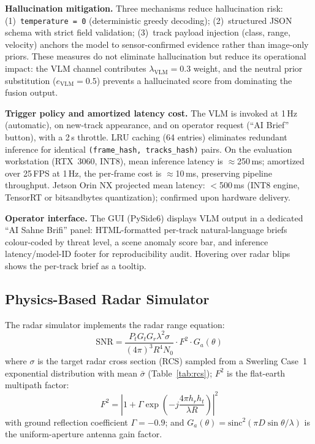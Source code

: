 \documentclass[drones,article,submit,pdftex]{Definitions/mdpi}
\begin{document}
\textbf{Hallucination mitigation.}
Three mechanisms reduce hallucination risk:
(1)~\texttt{temperature = 0} (deterministic greedy decoding);
(2)~structured JSON schema with strict field validation;
(3)~track payload injection (class, range, velocity) anchors the model
to sensor-confirmed evidence rather than image-only priors.
These measures do not eliminate hallucination but reduce its operational
impact: the VLM channel contributes $\lambda_\text{VLM} = 0.3$ weight,
and the neutral prior substitution ($e_\text{VLM} = 0.5$) prevents a
hallucinated score from dominating the fusion output.

\textbf{Trigger policy and amortized latency cost.}
The VLM is invoked at 1\,Hz (automatic), on new-track appearance, and on
operator request (``AI Brief'' button), with a 2\,s throttle.
LRU caching (64 entries) eliminates redundant inference for identical
\texttt{(frame\_hash, tracks\_hash)} pairs.
On the evaluation workstation (RTX~3060, INT8), mean inference latency is
$\approx$250\,ms; amortized over 25\,FPS at 1\,Hz, the per-frame cost is
$\approx$10\,ms, preserving pipeline throughput.
Jetson Orin NX projected mean latency: $<$500\,ms (INT8 engine,
TensorRT or bitsandbytes quantization); confirmed upon hardware delivery.

\textbf{Operator interface.}
The GUI (PySide6) displays VLM output in a dedicated ``AI Sahne Brifi'' panel:
HTML-formatted per-track natural-language briefs colour-coded by threat level,
a scene anomaly score bar, and inference latency/model-ID footer for
reproducibility audit.
Hovering over radar blips shows the per-track brief as a tooltip.

\subsection{Physics-Based Radar Simulator}
\label{sec:radar_sim}

The radar simulator implements the radar range equation:
\begin{equation}
  \text{SNR} = \frac{P_t G_t G_r \lambda^2 \sigma}{(4\pi)^3 R^4 N_0}
  \cdot F^2 \cdot G_a(\theta)
  \label{eq:radar_eq}
\end{equation}
where $\sigma$ is the target radar cross section (RCS) sampled from
a Swerling Case~1 exponential distribution with mean $\bar{\sigma}$
(Table~\ref{tab:rcs}); $F^2$ is the flat-earth multipath factor:
\begin{equation}
  F^2 = \left|1 + \Gamma \exp\!\left(-j \frac{4\pi h_r h_t}{\lambda R}\right)\right|^2
  \label{eq:multipath}
\end{equation}
with ground reflection coefficient $\Gamma = -0.9$; and
$G_a(\theta) = \text{sinc}^2(\pi D \sin\theta / \lambda)$ is the
uniform-aperture antenna gain factor.
\end{document}
